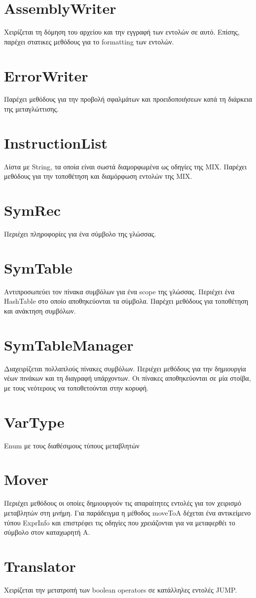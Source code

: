 \documentclass[12pt,a4paper]{report}
\begin{document}
\section*{AssemblyWriter}
Χειρίζεται τη δόμηση του αρχείου και την εγγραφή των εντολών σε αυτό. Επίσης, 
παρέχει στατικες μεθόδους για το formatting των εντολών.
\section*{ErrorWriter}
Παρέχει μεθόδους για την προβολή σφαλμάτων και προειδοποιήσεων κατά τη 
διάρκεια της μεταγλώττισης.
\section*{InstructionList}
Λίστα με String, τα οποία είναι σωστά διαμορφωμένα ως οδηγίες της MIX. Παρέχει 
μεθόδους για την τοποθέτηση και διαμόρφωση εντολών της MIX.
\section*{SymRec}
Περιέχει πληροφορίες για ένα σύμβολο της γλώσσας.
\section*{SymTable}
Αντιπροσωπεύει τον πίνακα συμβόλων για ένα scope της γλώσσας. Περιέχει ένα 
HashTable στο οποίο αποθηκεύονται τα σύμβολα. Παρέχει μεθόδους για τοποθέτηση 
και ανάκτηση συμβόλων.
\section*{SymTableManager}
Διαχειρίζεται πολλαπλούς πίνακες συμβόλων. Περιέχει μεθόδους για την δημιουργία 
νέων πινάκων και τη διαγραφή υπάρχοντων. Οι πίνακες αποθηκεύονται σε μία στοίβα, 
με τους νεότερους να τοποθετούνται στην κορυφή.
\section*{VarType}
Enum με τους διαθέσιμους τύπους μεταβλητών
\section*{Mover}
Περιέχει μεθόδους οι οποίες δημιουργούν τις απαραίτητες εντολές για τον χειρισμό 
μεταβλητών στη μνήμη. Για παράδειγμα η μέθοδος moveToA δέχεται ένα αντικείμενο 
τύπου ExprInfo και επιστρέφει τις οδηγίες που χρειάζονται για να μεταφερθέι το 
σύμβολο στον καταχωρητή Α.
\section*{Translator}
Χειρίζεται την μετατροπή των boolean operators σε κατάλληλες εντολές JUMP.
\end{document}
